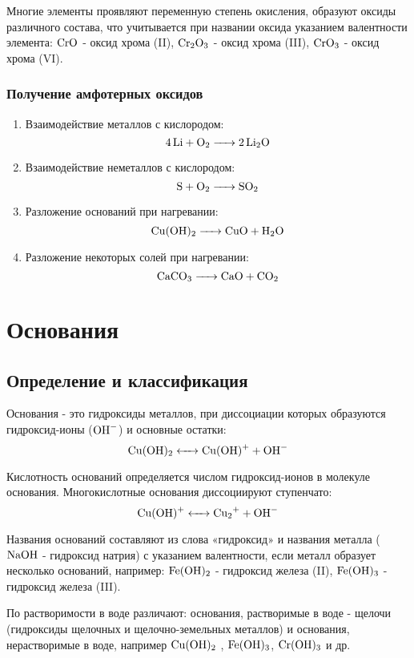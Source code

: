 Многие элементы проявляют переменную степень окисления, образуют оксиды
различного состава, что учитывается при названии оксида указанием валентности
элемента: $\ce{CrO}$ - оксид хрома (II), $\ce{Cr2O3}$ - оксид хрома (III), $\ce{CrO3}$ - оксид хрома (VI).

\subsubsection{Получение амфотерных оксидов}

\begin{enumerate}
    \item Взаимодействие металлов с кислородом:
        $$\ce{4Li + O2 -> 2Li2O}$$

    \item Взаимодействие неметаллов с кислородом:
        $$\ce{S + O2 -> SO2}$$

    \item Разложение оснований при нагревании:
        $$\ce{Cu(OH)2 -> CuO + H2O}$$

    \item Разложение некоторых солей при нагревании:
        $$\ce{CaCO3 -> CaO + CO2}$$
\end{enumerate}

\section{Основания}

\subsection{Определение и классификация}
Основания - это гидроксиды металлов, при диссоциации которых
образуются гидроксид-ионы ($\ce{OH-}$) и основные остатки:
$$\ce{Cu(OH)2 <-> Cu(OH)+ + OH-}$$

Кислотность оснований определяется числом гидроксид-ионов в молекуле
основания. Многокислотные основания диссоциируют ступенчато:
$$\ce{Cu(OH)+ <-> Cu2+ + OH-}$$

Названия оснований составляют из слова «гидроксид» и названия металла
($\ce{NaOH}$ - гидроксид натрия) с указанием валентности, если металл образует несколько
оснований, например: $\ce{Fe(OH)2}$ - гидроксид железа (II), $\ce{Fe(OH)3}$ - гидроксид железа (III).

По растворимости в воде различают: основания, растворимые в воде - щелочи (гидроксиды щелочных и щелочно-земельных металлов) и основания, нерастворимые в воде, например $\ce{Cu(OH)2}$ , $\ce{Fe(OH)3}$, $\ce{Cr(OH)3}$ и др.

